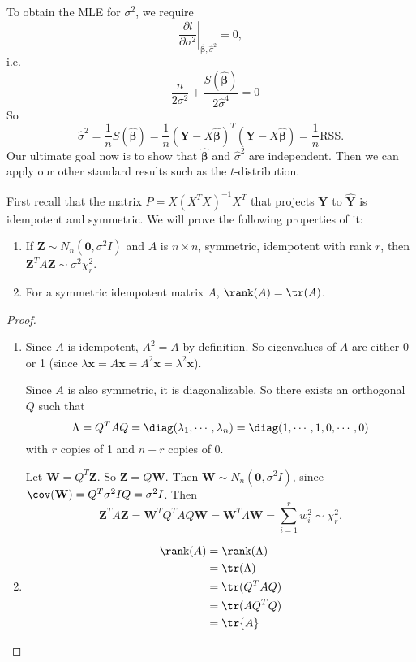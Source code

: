 \documentclass[a4paper]{article}
\begin{document}
To obtain the MLE for $\sigma^2$, we require
\[
  \left.\frac{\partial l}{\partial \sigma^2}\right|_{\hat{\boldsymbol\beta}, \hat{\sigma}^2} = 0,
\]
i.e.
\[
  -\frac{n}{2\sigma^2} + \frac{S(\hat{\boldsymbol\beta})}{2 \hat{\sigma}^4} = 0
\]
So
\[
  \hat{\sigma}^2 = \frac{1}{n}S(\hat{\boldsymbol\beta}) = \frac{1}{n}(\mathbf{Y} - X\hat{\boldsymbol\beta})^T(\mathbf{Y} - X\hat{\boldsymbol\beta}) = \frac{1}{n}\mathrm{RSS}.
\]
Our ultimate goal now is to show that $\hat{\boldsymbol\beta}$ and $\hat{\sigma}^2$ are independent. Then we can apply our other standard results such as the $t$-distribution.

First recall that the matrix $P = X(X^TX)^{-1}X^T$ that projects $\mathbf{Y}$ to $\hat{\mathbf{Y}}$ is idempotent and symmetric. We will prove the following properties of it:
\begin{lemma}\leavevmode
  \begin{enumerate}
    \item If $\mathbf{Z}\sim N_n(\mathbf{0}, \sigma^2 I)$ and $A$ is $n\times n$, symmetric, idempotent with rank $r$, then $\mathbf{Z}^TA\mathbf{Z} \sim \sigma^2 \chi_r^2$.
    \item For a symmetric idempotent matrix $A$, $\rank(A) = \tr(A)$.
  \end{enumerate}
\end{lemma}

\begin{proof}\leavevmode
  \begin{enumerate}
    \item Since $A$ is idempotent, $A^2 = A$ by definition. So eigenvalues of $A$ are either 0 or 1 (since $\lambda \mathbf{x} = A\mathbf{x} = A^2 \mathbf{x} = \lambda^2 \mathbf{x}$).

      Since $A$ is also symmetric, it is diagonalizable. So there exists an orthogonal $Q$ such that
      \[
        \Lambda = Q^TAQ = \diag(\lambda_1, \cdots, \lambda_n) = \diag(1, \cdots, 1, 0, \cdots, 0)
      \]
      with $r$ copies of 1 and $n - r$ copies of $0$.

      Let $\mathbf{W} = Q^T\mathbf{Z}$. So $\mathbf{Z} = Q\mathbf{W}$. Then $\mathbf{W}\sim N_n(\mathbf{0}, \sigma^2 I)$, since $\cov(\mathbf{W}) = Q^T\sigma^2 IQ = \sigma^2 I$. Then
      \[
        \mathbf{Z}^TA\mathbf{Z} = \mathbf{W}^T Q^TAQ\mathbf{W} = \mathbf{W}^T\Lambda \mathbf{W} = \sum_{i = 1}^r w_i^2 \sim \chi_r^2.
      \]
    \item
      \begin{align*}
        \rank (A) &= \rank (\Lambda)\\
        &= \tr (\Lambda)\\
        &= \tr (Q^TAQ)\\
        &= \tr (AQ^TQ)\\
        &= \tr {A}\qedhere
      \end{align*}%
  \end{enumerate}
\end{proof}
\end{document}
